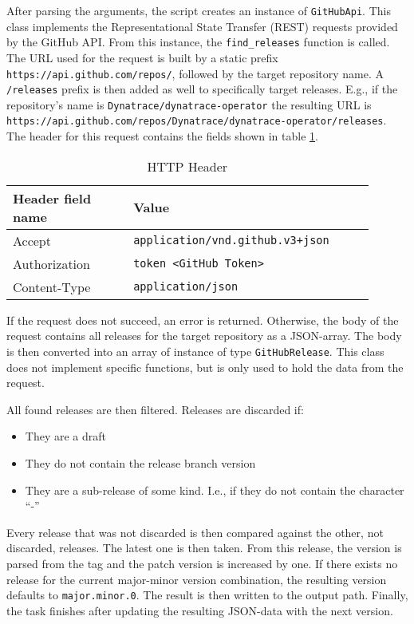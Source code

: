 After parsing the arguments, the script creates an instance of \verb|GitHubApi|.
This class implements the Representational State Transfer (REST) requests provided by the GitHub API.
From this instance, the \verb|find_releases| function is called.
The URL used for the request is built by a static prefix \verb|https://api.github.com/repos/|, followed by the target repository name.
A \verb|/releases| prefix is then added as well to specifically target releases.
E.g., if the repository's name is \verb|Dynatrace/dynatrace-operator| the resulting URL is \verb|https://api.github.com/repos/Dynatrace/dynatrace-operator/releases|.
The header for this request contains the fields shown in table \ref{tab:http-header}.

\begin{table}[H]
    \centering
    \caption{HTTP Header}
    \label{tab:http-header}
    \begin{tabular}{p{0.3\linewidth}|p{0.6\linewidth}}
        Header field name & Value \\
        \hline
        Accept & \verb|application/vnd.github.v3+json| \\
        Authorization & \verb|token <GitHub Token>| \\
        Content-Type & \verb|application/json| \\
    \end{tabular}
\end{table}

If the request does not succeed, an error is returned.
Otherwise, the body of the request contains all releases for the target repository as a JSON-array.
The body is then converted into an array of instance of type \verb|GitHubRelease|.
This class does not implement specific functions, but is only used to hold the data from the request.

All found releases are then filtered.
Releases are discarded if:
\begin{itemize}
    \item They are a draft
    \item They do not contain the release branch version
    \item They are a sub-release of some kind.
        I.e., if they do not contain the character ``-''
\end{itemize}

Every release that was not discarded is then compared against the other, not discarded, releases.
The latest one is then taken.
From this release, the version is parsed from the tag and the patch version is increased by one.
If there exists no release for the current major-minor version combination, the resulting version defaults to \verb|major.minor.0|.
The result is then written to the output path.
Finally, the task finishes after updating the resulting JSON-data with the next version.
